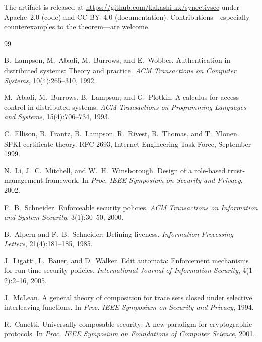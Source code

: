 \documentclass[11pt,a4paper]{article}
\theoremstyle{plain}
\theoremstyle{definition}
\theoremstyle{remark}
\begin{document}
The artifact is released at
\url{https://github.com/kakashi-kx/synectivsec} under Apache~2.0 (code) and
CC-BY~4.0 (documentation). Contributions---especially counterexamples to the
theorem---are welcome.

\begin{thebibliography}{99}

B.~Lampson, M.~Abadi, M.~Burrows, and E.~Wobber.
\newblock Authentication in distributed systems: Theory and practice.
\newblock \emph{ACM Transactions on Computer Systems}, 10(4):265--310, 1992.

M.~Abadi, M.~Burrows, B.~Lampson, and G.~Plotkin.
\newblock A calculus for access control in distributed systems.
\newblock \emph{ACM Transactions on Programming Languages and Systems},
15(4):706--734, 1993.

C.~Ellison, B.~Frantz, B.~Lampson, R.~Rivest, B.~Thomas, and T.~Ylonen.
\newblock SPKI certificate theory.
\newblock RFC 2693, Internet Engineering Task Force, September 1999.

N.~Li, J.~C.~Mitchell, and W.~H.~Winsborough.
\newblock Design of a role-based trust-management framework.
\newblock In \emph{Proc. IEEE Symposium on Security and Privacy}, 2002.

F.~B.~Schneider.
\newblock Enforceable security policies.
\newblock \emph{ACM Transactions on Information and System Security},
3(1):30--50, 2000.

B.~Alpern and F.~B.~Schneider.
\newblock Defining liveness.
\newblock \emph{Information Processing Letters}, 21(4):181--185, 1985.

J.~Ligatti, L.~Bauer, and D.~Walker.
\newblock Edit automata: Enforcement mechanisms for run-time security
policies.
\newblock \emph{International Journal of Information Security},
4(1--2):2--16, 2005.

J.~McLean.
\newblock A general theory of composition for trace sets closed under
selective interleaving functions.
\newblock In \emph{Proc. IEEE Symposium on Security and Privacy}, 1994.

R.~Canetti.
\newblock Universally composable security: A new paradigm for cryptographic
protocols.
\newblock In \emph{Proc. IEEE Symposium on Foundations of Computer Science},
2001.


\end{thebibliography}
\end{document}
